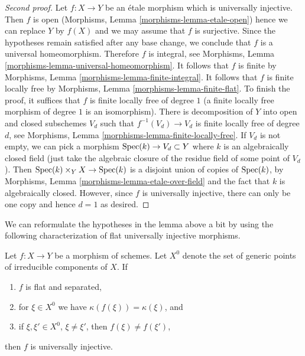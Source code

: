 \begin{proof}[Second proof]
Let $f : X \to Y$ be an \'etale morphism which is universally injective.
Then $f$ is open (Morphisms, Lemma \ref{morphisms-lemma-etale-open})
hence we can replace $Y$ by $f(X)$ and we may assume that $f$ is surjective.
Since the hypotheses remain satisfied after any base change, we conclude
that $f$ is a universal homeomorphism. Therefore $f$ is integral, see
Morphisms, Lemma \ref{morphisms-lemma-universal-homeomorphism}.
It follows that $f$ is finite by
Morphisms, Lemma \ref{morphisms-lemma-finite-integral}.
It follows that $f$ is finite locally free by
Morphisms, Lemma \ref{morphisms-lemma-finite-flat}.
To finish the proof, it suffices that $f$ is finite locally
free of degree $1$ (a finite locally free morphism of degree $1$
is an isomorphism).
There is decomposition of $Y$ into open and closed subschemes
$V_d$ such that $f^{-1}(V_d) \to V_d$ is finite locally free of
degree $d$, see Morphisms, Lemma \ref{morphisms-lemma-finite-locally-free}.
If $V_d$ is not empty, we can pick a morphism $\mathop{\mathrm{Spec}}(k) \to V_d \subset Y$
where $k$ is an algebraically closed field (just take the algebraic
closure of the residue field of some point of $V_d$).
Then $\mathop{\mathrm{Spec}}(k) \times_Y X \to \mathop{\mathrm{Spec}}(k)$ is a disjoint union of
copies of $\mathop{\mathrm{Spec}}(k)$, by
Morphisms, Lemma \ref{morphisms-lemma-etale-over-field}
and the fact that $k$ is algebraically closed.
However, since $f$ is universally injective, there can only be
one copy and hence $d = 1$ as desired.
\end{proof}

\noindent
We can reformulate the hypotheses in the lemma above a bit by using the
following characterization of flat universally injective morphisms.

\begin{lemma}
\label{lemma-flat-universally-injective}
Let $f : X \to Y$ be a morphism of schemes. Let $X^0$ denote the set
of generic points of irreducible components of $X$. If
\begin{enumerate}
\item $f$ is flat and separated,
\item for $\xi \in X^0$ we have $\kappa(f(\xi)) = \kappa(\xi)$, and
\item if $\xi, \xi' \in X^0$, $\xi \not = \xi'$, then $f(\xi) \not = f(\xi')$,
\end{enumerate}
then $f$ is universally injective.
\end{lemma}

